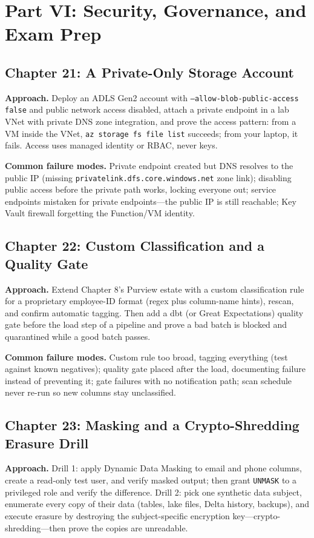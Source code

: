 \section{Part VI: Security, Governance, and Exam Prep}

\subsection*{Chapter 21: A Private-Only Storage Account}
\textbf{Approach.} Deploy an ADLS Gen2 account with \texttt{--allow-blob-public-access false}
and public network access disabled, attach a private endpoint in a lab VNet with private DNS zone
integration, and prove the access pattern: from a VM inside the VNet, \texttt{az storage fs file
list} succeeds; from your laptop, it fails. Access uses managed identity or RBAC, never keys.

\textbf{Common failure modes.} Private endpoint created but DNS resolves to the public IP (missing
\texttt{privatelink.dfs.core.windows.net} zone link); disabling public access before the private
path works, locking everyone out; service endpoints mistaken for private endpoints---the public
IP is still reachable; Key Vault firewall forgetting the Function/VM identity.

\subsection*{Chapter 22: Custom Classification and a Quality Gate}
\textbf{Approach.} Extend Chapter 8's Purview estate with a custom classification rule for a
proprietary employee-ID format (regex plus column-name hints), rescan, and confirm automatic
tagging. Then add a dbt (or Great Expectations) quality gate before the load step of a pipeline
and prove a bad batch is blocked and quarantined while a good batch passes.

\textbf{Common failure modes.} Custom rule too broad, tagging everything (test against known
negatives); quality gate placed after the load, documenting failure instead of preventing it;
gate failures with no notification path; scan schedule never re-run so new columns stay
unclassified.

\subsection*{Chapter 23: Masking and a Crypto-Shredding Erasure Drill}
\textbf{Approach.} Drill 1: apply Dynamic Data Masking to email and phone columns, create a
read-only test user, and verify masked output; then grant \texttt{UNMASK} to a privileged role
and verify the difference. Drill 2: pick one synthetic data subject, enumerate every copy of
their data (tables, lake files, Delta history, backups), and execute erasure by destroying the
subject-specific encryption key---crypto-shredding---then prove the copies are unreadable.

